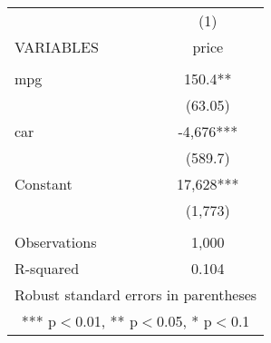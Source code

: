 \documentclass[]{article}
\begin{document}
\begin{tabular}{lc} \hline
 & (1) \\
VARIABLES & price \\ \hline
 &  \\
mpg & 150.4** \\
 & (63.05) \\
car & -4,676*** \\
 & (589.7) \\
Constant & 17,628*** \\
 & (1,773) \\
 &  \\
Observations & 1,000 \\
 R-squared & 0.104 \\ \hline
\multicolumn{2}{c}{ Robust standard errors in parentheses} \\
\multicolumn{2}{c}{ *** p$<$0.01, ** p$<$0.05, * p$<$0.1} \\
\end{tabular}
\end{document}
